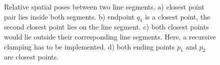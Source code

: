 \begin{figure}[h!]
\centering     %
{}
\caption{Relative spatial poses between two line segments. a) closest point pair lies inside both segments. b) endpoint $q_1$ is a closest point, the second closest point lies on the line segment. c) both closest points would lie outside their corresponding line segments. Here, a recursive clamping has to be implemented. d) both ending points $p_1$ and $p_2$ are closest points. } 
\label{figlinesegments}
\end{figure}

